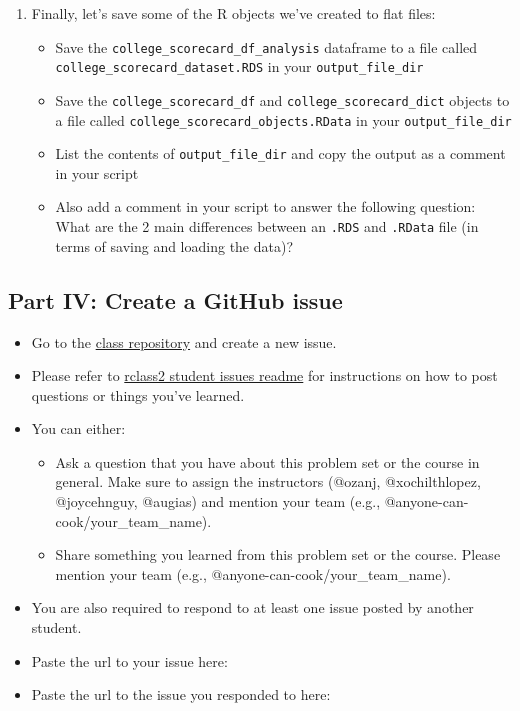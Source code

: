 \documentclass[
]{article}
\providecommand{\tightlist}{%
  \setlength{\itemsep}{0pt}\setlength{\parskip}{0pt}}
\begin{document}
\begin{enumerate}
\def\labelenumi{\arabic{enumi}.}
\setcounter{enumi}{4}
\item
  Finally, let's save some of the R objects we've created to flat files:

  \begin{itemize}
  \tightlist
  \item
    Save the \texttt{college\_scorecard\_df\_analysis} dataframe to a
    file called \texttt{college\_scorecard\_dataset.RDS} in your
    \texttt{output\_file\_dir}
  \item
    Save the \texttt{college\_scorecard\_df} and
    \texttt{college\_scorecard\_dict} objects to a file called
    \texttt{college\_scorecard\_objects.RData} in your
    \texttt{output\_file\_dir}
  \item
    List the contents of \texttt{output\_file\_dir} and copy the output
    as a comment in your script
  \item
    Also add a comment in your script to answer the following question:
    What are the 2 main differences between an \texttt{.RDS} and
    \texttt{.RData} file (in terms of saving and loading the data)?
  \end{itemize}
\end{enumerate}

\hypertarget{part-iv-create-a-github-issue}{%
\subsection{Part IV: Create a GitHub
issue}\label{part-iv-create-a-github-issue}}

\begin{itemize}
\item
  Go to the
  \href{https://github.com/anyone-can-cook/rclass2_student_issues_w23/issues}{class
  repository} and create a new issue.
\item
  Please refer to
  \href{https://github.com/anyone-can-cook/rclass2_student_issues_w23/blob/main/README.md}{rclass2
  student issues readme} for instructions on how to post questions or
  things you've learned.
\item
  You can either:

  \begin{itemize}
  \tightlist
  \item
    Ask a question that you have about this problem set or the course in
    general. Make sure to assign the instructors (@ozanj,
    @xochilthlopez, @joycehnguy, @augias) and mention your team (e.g.,
    @anyone-can-cook/your\_team\_name).
  \item
    Share something you learned from this problem set or the course.
    Please mention your team (e.g., @anyone-can-cook/your\_team\_name).
  \end{itemize}
\item
  You are also required to respond to at least one issue posted by
  another student.
\item
  Paste the url to your issue here:
\item
  Paste the url to the issue you responded to here:
\end{itemize}
\end{document}
